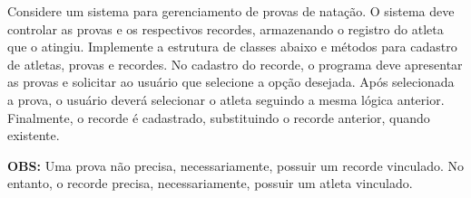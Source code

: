 \begin{exercise}[Natacao]
Considere um sistema para gerenciamento de provas de natação. O sistema deve controlar as provas e os respectivos recordes, armazenando o registro do atleta que o atingiu. Implemente a estrutura de classes abaixo e métodos para cadastro de atletas, provas e recordes. No cadastro do recorde, o programa deve apresentar as provas e solicitar ao usuário que selecione a opção desejada. Após selecionada a prova, o usuário deverá selecionar o atleta seguindo a mesma lógica anterior. Finalmente, o recorde é cadastrado, substituindo o recorde anterior, quando existente.

\textbf{OBS:} Uma prova não precisa, necessariamente, possuir um recorde vinculado. No entanto, o recorde precisa, necessariamente, possuir um atleta vinculado.
	
\begin{figure}[h]
	\centering
\end{figure}
\end{exercise}

